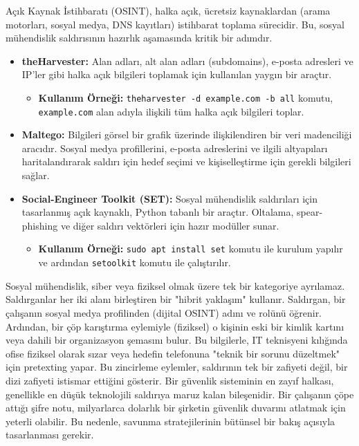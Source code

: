 Açık Kaynak İstihbaratı (OSINT), halka açık, ücretsiz kaynaklardan (arama motorları, sosyal medya, DNS kayıtları) istihbarat toplama sürecidir. Bu, sosyal mühendislik saldırısının hazırlık aşamasında kritik bir adımdır.
\begin{itemize}
    \item \textbf{theHarvester:} Alan adları, alt alan adları (subdomains), e-posta adresleri ve IP'ler gibi halka açık bilgileri toplamak için kullanılan yaygın bir araçtır.
    \begin{itemize}
        \item \textbf{Kullanım Örneği:} \verb|theharvester -d example.com -b all| komutu, \verb|example.com| alan adıyla ilişkili tüm halka açık bilgileri toplar.
    \end{itemize}
    \item \textbf{Maltego:} Bilgileri görsel bir grafik üzerinde ilişkilendiren bir veri madenciliği aracıdır. Sosyal medya profillerini, e-posta adreslerini ve ilgili altyapıları haritalandırarak saldırı için hedef seçimi ve kişiselleştirme için gerekli bilgileri sağlar.
    \item \textbf{Social-Engineer Toolkit (SET):} Sosyal mühendislik saldırıları için tasarlanmış açık kaynaklı, Python tabanlı bir araçtır. Oltalama, spear-phishing ve diğer saldırı vektörleri için hazır modüller sunar.
    \begin{itemize}
        \item \textbf{Kullanım Örneği:} \verb|sudo apt install set| komutu ile kurulum yapılır ve ardından \verb|setoolkit| komutu ile çalıştırılır.
    \end{itemize}
\end{itemize}

Sosyal mühendislik, siber veya fiziksel olmak üzere tek bir kategoriye ayrılamaz. Saldırganlar her iki alanı birleştiren bir "hibrit yaklaşım" kullanır. Saldırgan, bir çalışanın sosyal medya profilinden (dijital OSINT) adını ve rolünü öğrenir. Ardından, bir çöp karıştırma eylemiyle (fiziksel) o kişinin eski bir kimlik kartını veya dahili bir organizasyon şemasını bulur. Bu bilgilerle, IT teknisyeni kılığında ofise fiziksel olarak sızar veya hedefin telefonuna "teknik bir sorunu düzeltmek" için pretexting yapar. Bu zincirleme eylemler, saldırının tek bir zafiyeti değil, bir dizi zafiyeti istismar ettiğini gösterir. Bir güvenlik sisteminin en zayıf halkası, genellikle en düşük teknolojili saldırıya maruz kalan bileşenidir. Bir çalışanın çöpe attığı şifre notu, milyarlarca dolarlık bir şirketin güvenlik duvarını atlatmak için yeterli olabilir. Bu nedenle, savunma stratejilerinin bütünsel bir bakış açısıyla tasarlanması gerekir.

